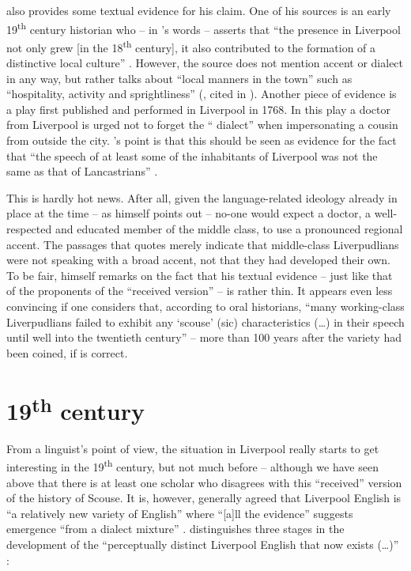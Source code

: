 \textcite{crowley2012} also provides some textual evidence for his claim. One of his sources is an early 19\textsuperscript{th} century historian who -- in \citeauthor{crowley2012}'s words -- asserts that ``the  presence in Liverpool not only grew [in the 18\textsuperscript{th} century], it also contributed to the formation of a distinctive local culture'' \citeyearpar[30]{crowley2012}.
However, the source does not mention accent or dialect in any way, but rather talks about ``local manners in the town'' such as ``hospitality, activity and sprightliness'' (\citealt{troughton1810}, cited in \citealt[30]{crowley2012}).
Another piece of evidence is a play first published and performed in Liverpool in 1768.
In this play a doctor from Liverpool is urged not to forget the `` dialect'' when impersonating a cousin from outside the city.
\citeauthor{crowley2012}'s point is that this should be seen as evidence for the fact that ``the speech of at least some of the inhabitants of Liverpool was not the same as that of Lancastrians'' \parencite[cf.][32--35]{crowley2012}.

This is hardly hot news.
After all, given the language-related ideology already in place at the time -- as \citeauthor{crowley2012} himself points out \citeyearpar[23]{crowley2012} -- no-one would expect a doctor, a well-respected and educated member of the middle class, to use a pronounced regional accent.
The passages that \citeauthor{crowley2012} quotes merely indicate that middle-class Liverpudlians were not speaking with a broad  accent, not that they had developed their own.
To be fair, \citeauthor{crowley2012} himself remarks on the fact that his textual evidence -- just like that of the proponents of the ``received version'' -- is rather thin.
It appears even less convincing if one considers that, according to oral historians, ``many working-class Liverpudlians failed to exhibit any `scouse' (sic) characteristics (\ldots) in their speech until well into the twentieth century''  \citep[43--44]{belchem2006d} -- more than 100 years after the variety had been coined, if \citeauthor{crowley2012} is correct.


	\section{19\textsuperscript{th} century}\label{sec.hist.19}

From a linguist's point of view, the situation in Liverpool really starts to get interesting in the 19\textsuperscript{th} century, but not much before -- although we have seen above that there is at least one scholar who disagrees with this ``received'' version of the history of Scouse.
It is, however, generally agreed that Liverpool English is ``a relatively new variety of English'' where ``[a]ll the evidence'' suggests emergence ``from a dialect mixture'' \citep[113 and 121]{honeybone2007}.
\citeauthor{honeybone2007} distinguishes three stages in the development of the ``perceptually distinct Liverpool English that now exists (\dots)'' \citeyearpar[119]{honeybone2007}:

